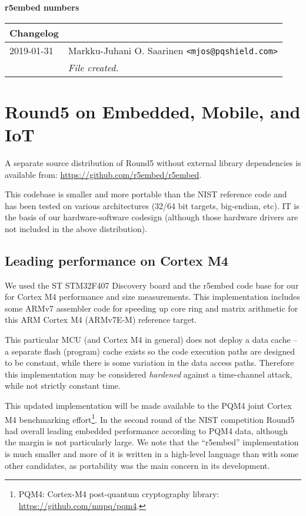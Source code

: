 \documentclass[a4paper]{article}
\begin{document}
\begin{center}
	{\large {\bf r5embed numbers \pdfdate}}

\vspace{3ex}
\begin{tabular}{l p{90mm}}
{\bf Changelog} \\
\hline
2019-01-31 	& Markku-Juhani O. Saarinen \verb|<mjos@pqshield.com>| \\
			& {\it File created.}	\\
\hline
\end{tabular}
\end{center}


\section{Round5 on Embedded, Mobile, and IoT}

A separate source distribution of Round5 without external library 
dependencies is available from: \url{https://github.com/r5embed/r5embed}.

This codebase is smaller and more portable than the NIST reference code and has 
been tested on various architectures (32/64 bit targets, big-endian, etc). IT is 
the basis of our hardware-software codesign (although those hardware drivers 
are not included in the above distribution).


\subsection{Leading performance on Cortex M4}

We used the ST STM32F407 Discovery board and the r5embed code base for our
for Cortex M4 performance and size measurements. This implementation 
includes some ARMv7 assembler code for speeding up core ring and matrix
arithmetic for this ARM Cortex M4 (ARMv7E-M) reference target.

This particular MCU (and Cortex M4 in general) does not deploy a data cache -- 
a separate flash (program) cache exists so the code execution paths are
designed to be constant, while there is some variation in the data 
access paths. Therefore this implementation may be considered \emph{hardened}
against a time-channel attack, while not strictly constant time.

This updated implementation will be made available to the PQM4 joint Cortex M4
benchmarking effort\footnote{PQM4: Cortex-M4 post-quantum cryptography library:  
\url{https://github.com/mupq/pqm4}.}. In the second round of the NIST 
competition Round5 had overall leading embedded performance according to PQM4 
data, although the margin is not particularly large. We note that the 
``r5embed'' implementation is much smaller and more of it is written in a 
high-level language than with some other candidates, as portability was the
main concern in its development.
\end{document}
